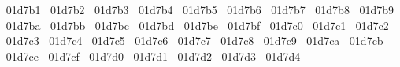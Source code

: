 {  ^^^^^^01d7b1%
  ^^^^^^01d7b2%
  ^^^^^^01d7b3%
  ^^^^^^01d7b4%
  ^^^^^^01d7b5%
  ^^^^^^01d7b6%
  ^^^^^^01d7b7%
  ^^^^^^01d7b8%
  ^^^^^^01d7b9%
  ^^^^^^01d7ba%
  ^^^^^^01d7bb%
  ^^^^^^01d7bc%
  ^^^^^^01d7bd%
  ^^^^^^01d7be%
  ^^^^^^01d7bf%
  ^^^^^^01d7c0%
  ^^^^^^01d7c1%
  ^^^^^^01d7c2%
  ^^^^^^01d7c3%
  ^^^^^^01d7c4%
  ^^^^^^01d7c5%
  ^^^^^^01d7c6%
  ^^^^^^01d7c7%
  ^^^^^^01d7c8%
  ^^^^^^01d7c9%
  ^^^^^^01d7ca%
  ^^^^^^01d7cb%
  ^^^^^^01d7ce%
  ^^^^^^01d7cf%
  ^^^^^^01d7d0%
  ^^^^^^01d7d1%
  ^^^^^^01d7d2%
  ^^^^^^01d7d3%
  ^^^^^^01d7d4%
}
